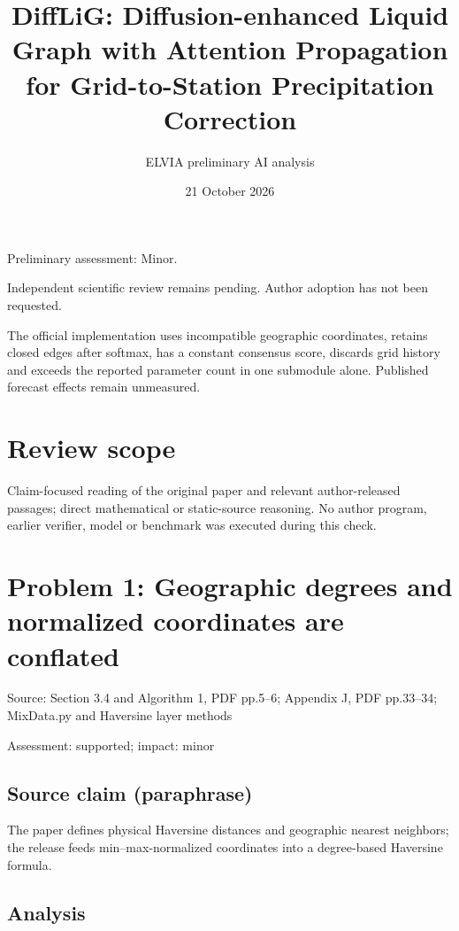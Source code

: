 \documentclass[11pt]{article}
\begin{document}
\title{DiffLiG: Diffusion-enhanced Liquid Graph with Attention Propagation for Grid-to-Station Precipitation Correction}

\author{ELVIA preliminary AI analysis}\date{21 October 2026}\maketitle

Preliminary assessment: Minor.\par

Independent scientific review remains pending. Author adoption has not been requested.

The official implementation uses incompatible geographic coordinates, retains closed edges after softmax, has a constant consensus score, discards grid history and exceeds the reported parameter count in one submodule alone. Published forecast effects remain unmeasured.

\section*{Review scope}

Claim-focused reading of the original paper and relevant author-released passages; direct mathematical or static-source reasoning. No author program, earlier verifier, model or benchmark was executed during this check.

\section*{Problem 1: Geographic degrees and normalized coordinates are conflated}

Source: Section 3.4 and Algorithm 1, PDF pp.5–6; Appendix J, PDF pp.33–34; MixData.py and Haversine layer methods

Assessment: supported; impact: minor

\subsection*{Source claim (paraphrase)}

The paper defines physical Haversine distances and geographic nearest neighbors; the release feeds min–max-normalized coordinates into a degree-based Haversine formula.

\subsection*{Analysis}
\end{document}

